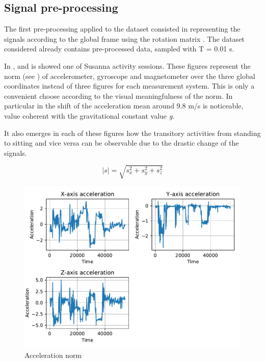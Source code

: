 \subsection{Signal pre-processing}
The first pre-processing applied to the dataset consisted in representing the signals according to the global frame using the rotation matrix . The dataset considered already contains pre-processed data, sampled with T = 0.01 s.

In ,  and  is showed one of Susanna activity sessions. These figures represent the norm (see ) of accelerometer, gyroscope and magnetometer over the three global coordinates instead of three figures for each measurement system. This is only a convenient choose according to the visual meaningfulness of the norm. In particular in  the shift of the acceleration mean around 9.8 m/s is noticeable, value coherent with the gravitational constant value \textit{g}.

It also emerges in each of these figures how the transitory activities from standing to sitting and vice versa can be observable due to the drastic change of the signals.


\begin{equation}
|s| = \sqrt{s_x^2+s_y^2+s_z^2}
\label{eq:norm}
\end{equation}



\begin{figure}[htp]
\includegraphics[scale=0.55]{acceleration_susanna.pdf}
\caption{Acceleration norm}
\label{fig:acc}
\end{figure}

